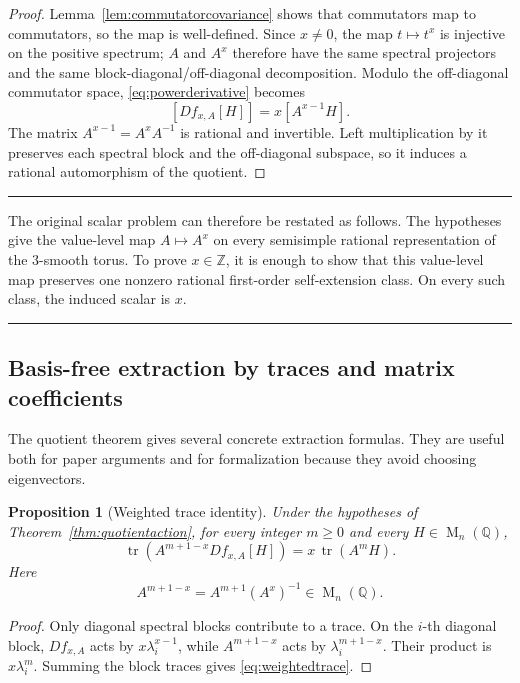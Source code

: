 \documentclass[11pt,oneside]{article}
\newtheorem{proposition}[theorem]{Proposition}
\theoremstyle{definition}
\theoremstyle{remark}
\newcommand{\Z}{\mathbb Z}
\newcommand{\Q}{\mathbb Q}
\newcommand{\Mat}{\operatorname{M}}
\newcommand{\tr}{\operatorname{tr}}
\newenvironment{resultbox}
{\begin{center}\begin{minipage}{0.94\textwidth}\hrule\vspace{0.45em}}
{\vspace{0.35em}\hrule\end{minipage}\end{center}}
\begin{document}
\begin{proof}
Lemma~\ref{lem:commutatorcovariance} shows that commutators map to commutators, so the map is
well-defined.  Since $x\ne0$, the map $t\mapsto t^x$ is injective on the
positive spectrum; $A$ and $A^x$ therefore have the same spectral projectors and the same
block-diagonal/off-diagonal decomposition.  Modulo the off-diagonal commutator space,
\eqref{eq:powerderivative} becomes
\[
 [Df_{x,A}[H]]=x[A^{x-1}H].
\]
The matrix $A^{x-1}=A^xA^{-1}$ is rational and invertible.  Left multiplication by it preserves
each spectral block and the off-diagonal subspace, so it induces a rational automorphism of the
quotient.
\end{proof}

\begin{resultbox}
The original scalar problem can therefore be restated as follows.  The hypotheses give the
value-level map $A\mapsto A^x$ on every semisimple rational representation of the $3$-smooth
torus.  To prove $x\in\Z$, it is enough to show that this value-level map preserves one nonzero
rational first-order self-extension class.  On every such class, the induced scalar is $x$.
\end{resultbox}

\subsection{Basis-free extraction by traces and matrix coefficients}

The quotient theorem gives several concrete extraction formulas.  They are useful both for
paper arguments and for formalization because they avoid choosing eigenvectors.

\begin{proposition}[Weighted trace identity]
\label{prop:weightedtrace}
Under the hypotheses of Theorem~\ref{thm:quotientaction}, for every integer $m\ge0$ and every
$H\in\Mat_n(\Q)$,
\begin{equation}
 \tr\!\left(A^{m+1-x}Df_{x,A}[H]\right)
 =x\,\tr(A^mH).
 \label{eq:weightedtrace}
\end{equation}
Here
\[
 A^{m+1-x}=A^{m+1}(A^x)^{-1}\in\Mat_n(\Q).
\]
\end{proposition}

\begin{proof}
Only diagonal spectral blocks contribute to a trace.  On the $i$-th diagonal block,
$Df_{x,A}$ acts by $x\lambda_i^{x-1}$, while $A^{m+1-x}$ acts by
$\lambda_i^{m+1-x}$.  Their product is $x\lambda_i^m$.  Summing the block traces gives
\eqref{eq:weightedtrace}.
\end{proof}
\end{document}
